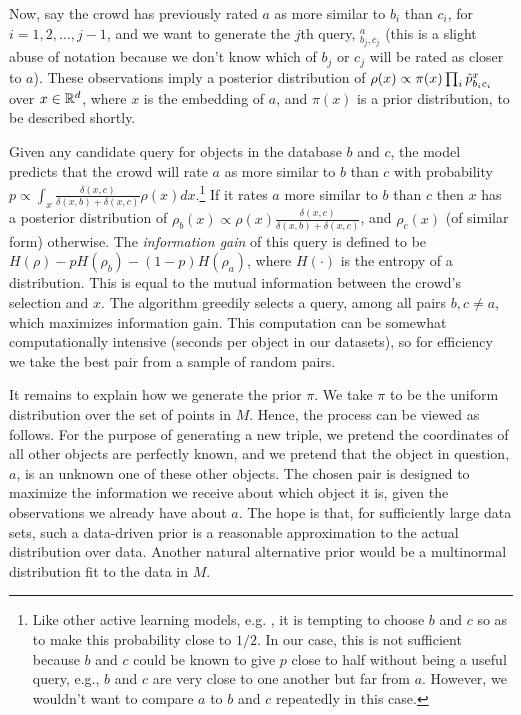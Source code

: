 \documentclass{article}
\begin{document}
Now, say the crowd has previously rated $a$ as more similar to $b_i$
than $c_i$, for $i=1,2,\ldots,j-1$, and we want to generate the $j$th
query, $^a_{b_j,c_j}$ (this is a slight abuse of notation because we
don't know which of $b_j$ or $c_j$ will be rated as closer to
$a$). These observations imply a posterior distribution of $\rho(x)
\propto \pi(x) \prod_i \hat{p}^{x}_{b_ic_i}$ over $x \in \mathbb{R}^d$, where
$x$ is the embedding of $a$, and $\pi(x)$ is a prior distribution, to
be described shortly.

Given any candidate query for objects in the database $b$ and $c$, the
model predicts that the crowd will rate $a$ as more similar to $b$
than $c$ with probability $p \propto \int_x
\frac{\delta(x,c)}{\delta(x,b)+\delta(x,c)}\rho(x)dx$.\footnote{Like
  other active learning models, e.g. \cite{??}, it is tempting to
  choose $b$ and $c$ so as to make this probability close to $1/2$.
  In our case, this is not sufficient because $b$ and $c$ could be
  known to give $p$ close to half without being a useful query, e.g.,
  $b$ and $c$ are very close to one another but far from $a$.
  However, we wouldn't want to compare $a$ to $b$ and $c$ repeatedly
  in this case.}  If it rates $a$ more similar to $b$ than $c$ then
$x$ has a posterior distribution of $\rho_b(x) \propto
\rho(x)\frac{\delta(x,c)}{\delta(x,b)+\delta(x,c)}$, and $\rho_c(x)$
(of similar form) otherwise.  The {\em information gain} of this query
is defined to be $H(\rho)-pH(\rho_b)-(1-p)H(\rho_a)$, where $H(\cdot)$
is the entropy of a distribution. This is equal to the mutual
information between the crowd's selection and $x$. The algorithm
greedily selects a query, among all pairs $b,c \neq a$, which
maximizes information gain.  This computation can be somewhat
computationally intensive (seconds per object in our datasets), so for
efficiency we take the best pair from a sample of random pairs.

It remains to explain how we generate the prior $\pi$.  We take $\pi$
to be the uniform distribution over the set of points in $M$.  Hence,
the process can be viewed as follows.  For the purpose of generating a
new triple, we pretend the coordinates of all other objects are
perfectly known, and we pretend that the object in question, $a$, is
an unknown one of these other objects.  The chosen pair is designed to
maximize the information we receive about which object it is, given
the observations we already have about $a$.  The hope is that, for
sufficiently large data sets, such a data-driven prior is a reasonable
approximation to the actual distribution over data.  Another natural
alternative prior would be a multinormal distribution fit to the data
in $M$.
\end{document}

